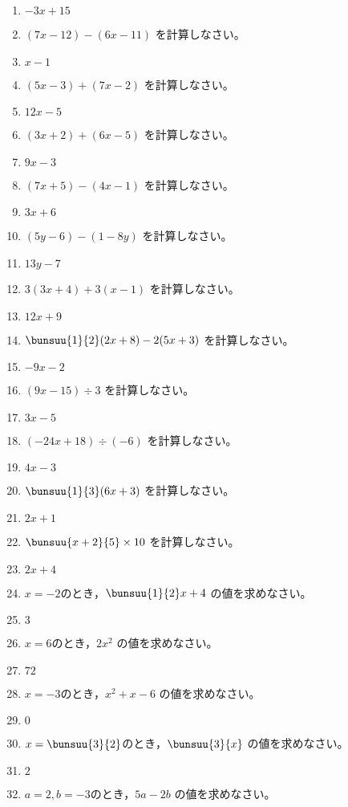 \documentclass[uplatex,a4j,11pt]{jsreport}
\begin{document}
\begin{multicols}{2}
\begin{enumerate}
    \item $-3x+15$
    \item $(7x-12)-(6x-11)$ を計算しなさい。%
    \item $x-1$
    \item $(5x-3)+(7x-2)$ を計算しなさい。%
    \item $12x-5$
    \item $(3x+2)+(6x-5)$ を計算しなさい。%
    \item $9x-3$
    \item $(7x+5)-(4x-1)$ を計算しなさい。%
    \item $3x+6$
    \item $(5y-6)-(1-8y)$ を計算しなさい。%
    \item $13y-7$
    \item $3(3x+4)+3(x-1)$ を計算しなさい。%
    \item $12x+9$
    \item $\bunsuu{1}{2}(2x+8)-2(5x+3)$ を計算しなさい。%
    \item $-9x-2$
    \item $(9x-15)\div3$ を計算しなさい。%
    \item $3x-5$
    \item $(-24x+18)\div(-6)$ を計算しなさい。%
    \item $4x-3$
    \item $\bunsuu{1}{3}(6x+3)$ を計算しなさい。%
    \item $2x+1$
    \item $\bunsuu{x+2}{5}\times10$ を計算しなさい。%
    \item $2x+4$
    \item $x=-2$のとき，$\bunsuu{1}{2}x+4$ の値を求めなさい。%
    \item $3$
    \item $x=6$のとき，$2x^2$ の値を求めなさい。%
    \item $72$
    \item $x=-3$のとき，$x^2+x-6$ の値を求めなさい。%
    \item $0$
    \item $x=\bunsuu{3}{2}$のとき，$\bunsuu{3}{x}$ の値を求めなさい。%
    \item $2$
    \item $a=2,b=-3$のとき，$5a-2b$ の値を求めなさい。%

\end{enumerate}
\end{multicols}
\end{document}
